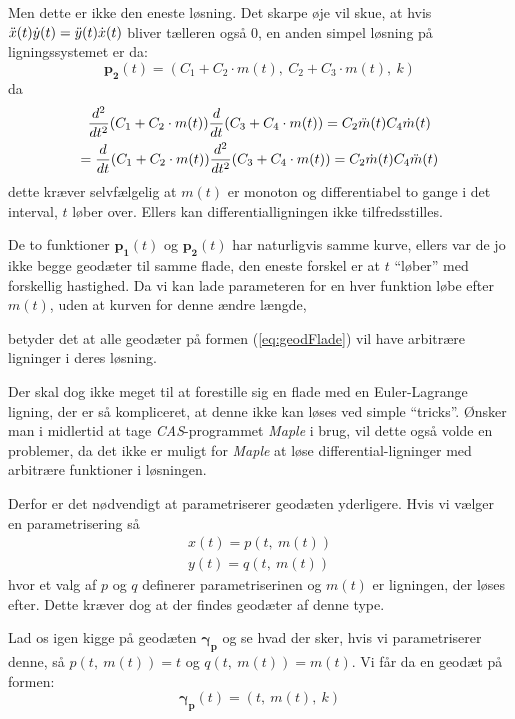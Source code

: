 Men dette er ikke den eneste løsning. Det skarpe øje vil skue, at hvis
\( \ddot{x}(t)\dot{y}(t) = \ddot{y}(t)\dot{x}(t) \)
bliver tælleren også \(0\), en anden simpel løsning på ligningssystemet er da:
\begin{equation*}
\pmb{p_2}(t) = (C_1 + C_2\cdot m(t),~C_2 + C_3\cdot m(t),~k)
\end{equation*}
da
\begin{equation*}
\begin{gathered}
\frac{d^2}{dt^2} (C_1 + C_2\cdot m(t)) \frac{d}{dt} (C_3 + C_4\cdot m(t)) = C_2\ddot{m}(t) C_4\dot{m}(t) \\
 = \frac{d}{dt} (C_1 + C_2\cdot m(t)) \frac{d^2}{dt^2} (C_3 + C_4\cdot m(t)) = C_2\dot{m}(t) C_4\ddot{m}(t) 
\end{gathered}
\end{equation*}
dette kræver selvfælgelig at \( m(t) \) er monoton og differentiabel to gange i det interval, \(t\) løber over.
Ellers kan differentialligningen ikke tilfredsstilles.

De to funktioner \(\pmb{p_1}(t)\) og \(\pmb{p_2}(t)\) har naturligvis samme kurve,
ellers var de jo ikke begge geodæter til samme flade, den eneste forskel er at \(t\) ``løber'' med forskellig hastighed.
Da vi kan lade parameteren for en hver funktion løbe efter \(m(t)\), uden at kurven for denne ændre længde,

betyder det at alle geodæter på formen (\ref{eq:geodFlade}) vil have arbitrære ligninger i deres løsning.


Der skal dog ikke meget til at forestille sig en flade med en Euler-Lagrange ligning, der er så kompliceret,
at denne ikke kan løses ved simple ``tricks''. Ønsker man i midlertid at tage \emph{CAS}-programmet \emph{Maple}
i brug, vil dette også volde en problemer,
da det ikke er muligt for \emph{Maple} at løse differential-ligninger med arbitrære funktioner i løsningen.

Derfor er det nødvendigt at parametriserer geodæten yderligere. Hvis vi vælger en parametrisering så
\begin{gather*}
x(t) = p(t,~m(t))\\
y(t) = q(t,~m(t))
\end{gather*}
hvor et valg af \(p\) og \(q\) definerer parametriserinen og \(m(t)\) er ligningen, der løses efter.
Dette kræver dog at der findes geodæter af denne type.

Lad os igen kigge på geodæten \(\pmb{\gamma_p}\) og se hvad der sker,
hvis vi parametriserer denne,
så \(p(t,~m(t) ) = t\) og \(q(t,~m(t) ) = m(t)\).
Vi får da en geodæt på formen:
\begin{equation*}
\pmb{\gamma_p}(t) = (t,~m(t),~k)
\end{equation*}
%

